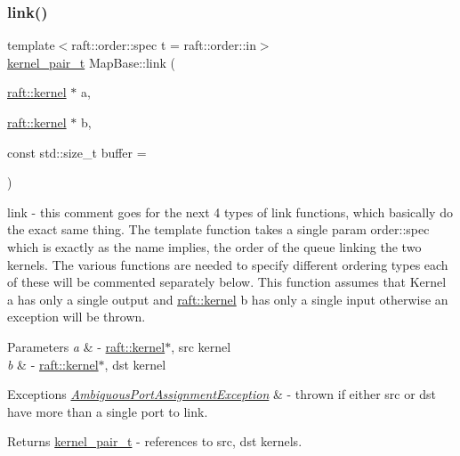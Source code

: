 \subsubsection{\texorpdfstring{link()}{link()}\hspace{0.1cm}{\footnotesize\ttfamily [1/4]}}
{\footnotesize\ttfamily template$<$raft\+::order\+::spec t = raft\+::order\+::in$>$ \\
\hyperlink{classkernel__pair__t}{kernel\+\_\+pair\+\_\+t} Map\+Base\+::link (\begin{DoxyParamCaption}\item[{\hyperlink{classraft_1_1kernel}{raft\+::kernel} $\ast$}]{a,  }\item[{\hyperlink{classraft_1_1kernel}{raft\+::kernel} $\ast$}]{b,  }\item[{const std\+::size\+\_\+t}]{buffer = {} }\end{DoxyParamCaption})\hspace{0.3cm}{\ttfamily [inline]}}

link -\/ this comment goes for the next 4 types of link functions, which basically do the exact same thing. The template function takes a single param order\+::spec which is exactly as the name implies, the order of the queue linking the two kernels. The various functions are needed to specify different ordering types each of these will be commented separately below. This function assumes that Kernel \textquotesingle{}a\textquotesingle{} has only a single output and \hyperlink{classraft_1_1kernel}{raft\+::kernel} \textquotesingle{}b\textquotesingle{} has only a single input otherwise an exception will be thrown. 
\begin{DoxyParams}{Parameters}
{\em a} & -\/ \hyperlink{classraft_1_1kernel}{raft\+::kernel}$\ast$, src kernel \\
\hline
{\em b} & -\/ \hyperlink{classraft_1_1kernel}{raft\+::kernel}$\ast$, dst kernel \\
\hline
\end{DoxyParams}

\begin{DoxyExceptions}{Exceptions}
{\em \hyperlink{class_ambiguous_port_assignment_exception}{Ambiguous\+Port\+Assignment\+Exception}} & -\/ thrown if either src or dst have more than a single port to link. \\
\hline
\end{DoxyExceptions}
\begin{DoxyReturn}{Returns}
\hyperlink{classkernel__pair__t}{kernel\+\_\+pair\+\_\+t} -\/ references to src, dst kernels. 
\end{DoxyReturn}


